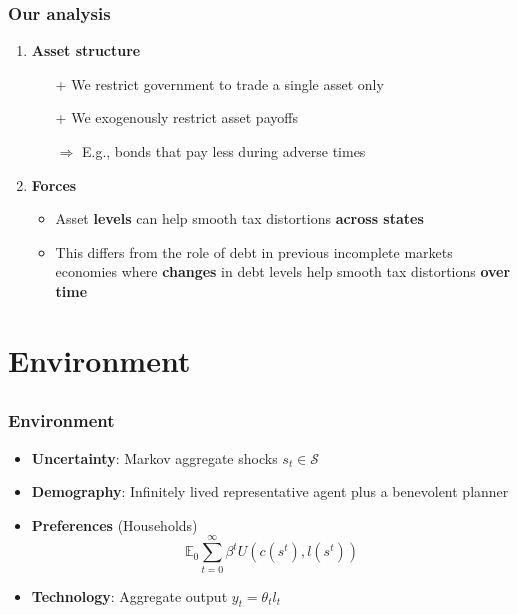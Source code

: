 \documentclass{beamer}
\begin{document}
\begin{frame}
\frametitle{Our analysis}

\begin{enumerate}
\item \textbf{Asset structure}
\begin{itemize}
\item [+] We restrict government  to trade a single asset only
\item [+] We exogenously restrict asset payoffs

 $\Longrightarrow$ E.g., bonds that pay less during adverse times

 \end{itemize}
\item \textbf{Forces}
\begin{itemize}
\item Asset {\color{black} \textbf{levels} } can help smooth tax distortions {\color{black} \textbf{ across  states}}
\item This differs from the  role of debt in previous incomplete markets  economies where { \color{black} \textbf{changes}} in debt levels help smooth tax distortions {\color{black}  \textbf{ over  time}}
\end{itemize}
\end{enumerate}

\end{frame}


\section{Environment}
\subsection{}

\begin{frame}
 \frametitle{Environment}
 \begin{itemize}
 \item \textbf{Uncertainty}: Markov aggregate shocks $s_t\in \mathcal{S}$
  \item \textbf{Demography}: Infinitely lived representative agent plus a benevolent planner
  \item \textbf{Preferences }(Households)
  \begin{equation*}
\mathbb{E}_{0}\sum_{t=0}^{\infty } \beta^t  U\left(
c(s^t),l(s^t)\right)  \label{utility lifetime}
\end{equation*}%
  \item \textbf{Technology}: Aggregate output  $y_t=\theta_{t} l_{t}$
   \end{itemize}

\end{frame}
\end{document}
